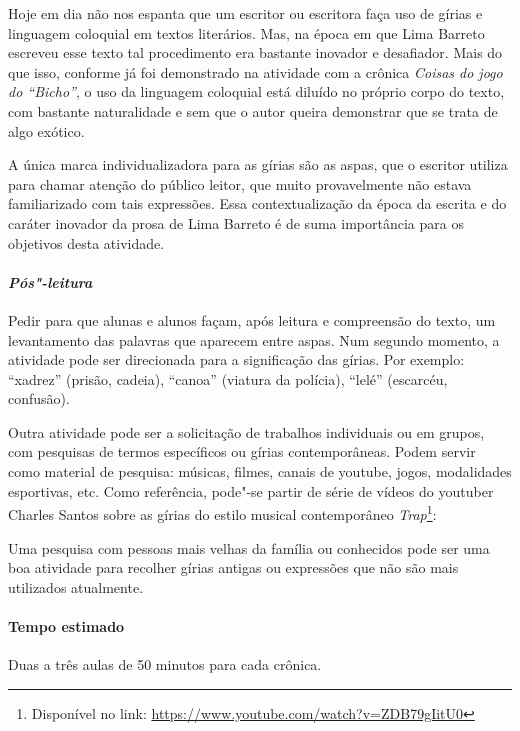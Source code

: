 \documentclass{extarticle}
\begin{document}
Hoje em dia não nos espanta que um escritor ou escritora faça uso de
gírias e linguagem coloquial em textos literários. Mas, na época em que
Lima Barreto escreveu esse texto tal procedimento era bastante inovador
e desafiador. Mais do que isso, conforme já foi demonstrado na atividade
com a crônica {\textit{Coisas do jogo do ``Bicho''}}, o uso da
linguagem coloquial está diluído no próprio corpo do texto, com bastante
naturalidade e sem que o autor queira demonstrar que se trata de algo
exótico.

A única marca individualizadora para as gírias são as aspas, que o
escritor utiliza para chamar atenção do público leitor, que muito
provavelmente não estava familiarizado com tais expressões. Essa
contextualização da época da escrita e do caráter inovador da prosa de
Lima Barreto é de suma importância para os objetivos desta atividade.

\paragraph{\textit{Pós"-leitura}}

Pedir para que alunas e alunos façam, após leitura e compreensão do
texto, um levantamento das palavras que aparecem entre aspas. Num
segundo momento, a atividade pode ser direcionada para a significação
das gírias. Por exemplo: ``xadrez'' (prisão, cadeia), ``canoa'' (viatura
da polícia), ``lelé'' (escarcéu, confusão).

Outra atividade pode ser a solicitação de trabalhos individuais ou em
grupos, com pesquisas de termos específicos ou gírias contemporâneas.
Podem servir como material de pesquisa: músicas, filmes, canais de
youtube, jogos, modalidades esportivas, etc. Como referência, pode"-se
partir de série de vídeos do youtuber Charles Santos sobre as gírias do
estilo musical contemporâneo \emph{Trap}\footnote{Disponível no link:
  \url{https://www.youtube.com/watch?v=ZDB79gIitU0}}:

Uma pesquisa com pessoas mais velhas da família ou conhecidos pode ser
uma boa atividade para recolher gírias antigas ou expressões que não são
mais utilizados atualmente.

\paragraph{Tempo estimado} Duas a três aulas de 50 minutos para cada
crônica.

\end{document}
